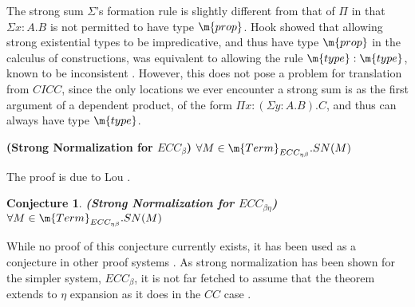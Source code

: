 The strong sum $\Sigma$'s formation rule is slightly different from that of $\Pi$ in that 
$\Sigma x : A . B$ is not permitted to have type $\m{prop}$.  Hook showed that allowing strong existential
types to be impredicative, and thus have type $\m{prop}$ in the calculus of constructions, 
was equivalent to allowing the rule $\m{type} : \m{type}$, known to be inconsistent 
\citep{hook1986impredicative}.  However, this does not pose a problem for translation from $CICC$, 
since the only locations we ever encounter a strong sum is as the first argument of a dependent product, 
of the form $\Pi x : (\Sigma y : A . B) . C$, and thus can always have type $\m{type}$.


\begin{theorem}
\textbf{(Strong Normalization for $ECC_{\beta}$)}  $\forall M \in \m{Term}_{ECC_{\eta\beta}}. SN(M)$
\label{ecc:sn}
\end{theorem}

The proof is due to Lou \citep{luo1989ecc}.

\newtheorem{conjecture}[theorem]{Conjecture}

\begin{conjecture}
\textbf{(Strong Normalization for $ECC_{\beta\eta}$)}  $\forall M \in \m{Term}_{ECC_{\eta\beta}}. SN(M)$
\label{ecc:sne}
\end{conjecture}

While no proof of this conjecture currently exists, it has been used
as a conjecture in other proof systems \citep{coquand2003logical}.  
As strong normalization has been shown for the simpler system, $ECC_\beta$, it is not
far fetched to assume that the theorem extends to $\eta$ expansion as it does in the $CC$ case 
\citep{barthe1995extensions}.


